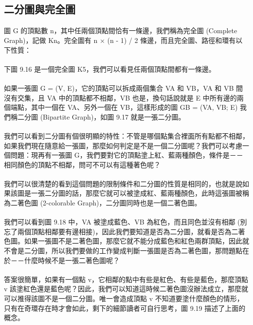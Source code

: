 \documentclass[12pt,a4paper,oneside]{report}
\begin{document}
\begin{CJK}{UTF8}{bkai}
\subsection{二分圖與完全圖}
\paragraph{}圖 G 的頂點數 n，其中任兩個頂點間恰有一條邊，我們稱為完全圖 (Complete Graph)，記做 Kn。完全圖有 n × (n - 1) / 2 條邊，而且完全圖、路徑和環有以下性質：
\paragraph{}下圖 9.16 是一個完全圖 K5，我們可以看見任兩個頂點間都有一條邊。
\paragraph{}如果一張圖 G = (V, E)，它的頂點可以拆成兩個集合 VA 和 VB，VA 和 VB 間沒有交集，且 VA 中的頂點都不相鄰，VB 也是，換句話說就是 E 中所有邊的兩個端點，其中一個在 VA、另外一個在 VB，這樣形成的圖 GB = (VA, VB; E) 我們稱二分圖 (Bipartite Graph)，如圖 9.17 就是一張二分圖。
\paragraph{}我們可以看到二分圖有個很明顯的特性：不管是哪個點集合裡面所有點都不相鄰，如果我們現在隨意給一張圖，那麼如何判定是不是一個二分圖呢？我們可以考慮一個問題：現再有一張圖 G，我們要對它的頂點塗上紅、藍兩種顏色，條件是－－相同顏色的頂點不相鄰，問可不可以有這種著色呢？
\paragraph{}我們可以很清楚的看到這個問題的限制條件和二分圖的性質是相同的，也就是說如果該圖是一張二分圖的話，那麼它就可以被塗成紅、藍兩種顏色，此時這張圖被稱為二著色圖 (2-colorable Graph)，二分圖同時也是一個二著色圖。
\paragraph{}我們可以看到圖 9.18 中，VA 被塗成藍色、VB 為紅色，而且同色並沒有相鄰 (別忘了兩個頂點相鄰要有邊相接)，因此我們要知道是否為二分圖，就看是否為二著色圖。如果一張圖不是二著色圖，那麼它就不能分成藍色和紅色兩群頂點，因此就不會是二分圖，所以我們要做的工作變成判斷一張圖是否為二著色圖，那問題點在於－－什麼時候不是一張二著色圖呢？
\paragraph{}答案很簡單，如果有一個點 v，它相鄰的點中有些是紅色、有些是藍色，那麼頂點 v 該塗紅色還是藍色呢？因此，我們可以知道這時候二著色圖沒辦法成立，那麼就可以推得該圖不是一個二分圖。唯一會造成頂點 v 不知道要塗什麼顏色的情形，只有在奇環存在時才會如此，剩下的細節讀者可自行思考，圖 9.19 描述了上面的概念。

\end{CJK}
\end{document}
